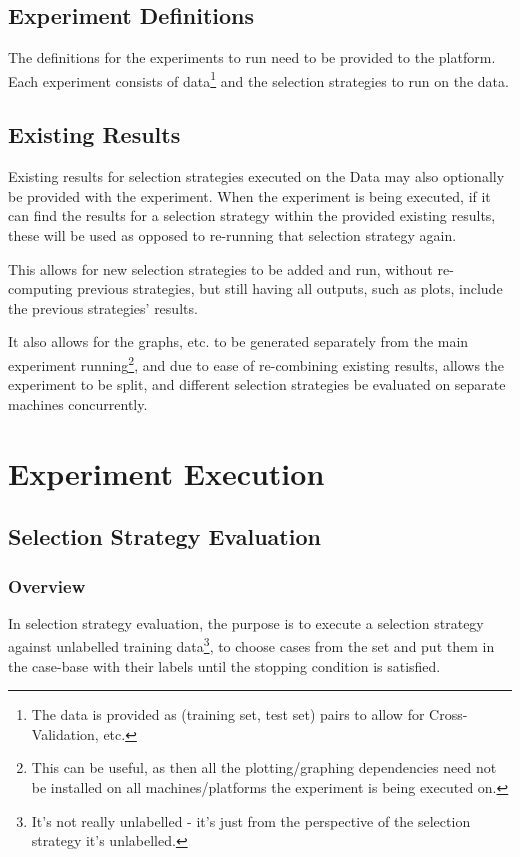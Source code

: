 \documentclass[a4paper,11pt]{report}
\begin{document}
\subsection{Experiment Definitions}
The definitions for the experiments to run need to be provided to the platform. Each experiment consists of data\footnote{ The data is provided as (training set, test set) pairs to allow for Cross-Validation, etc.} and the selection strategies to run on the data.

\subsection{Existing Results}
Existing results for selection strategies executed on the Data may also optionally be provided with the experiment. When the experiment is being executed, if it can find the results for a selection strategy within the provided existing results, these will be used as opposed to re-running that selection strategy again.

This allows for new selection strategies to be added and run, without re-computing previous strategies, but still having all outputs, such as plots, include the previous strategies' results.

It also allows for the graphs, etc. to be generated separately from the main experiment running\footnote{This can be useful, as then all the plotting/graphing dependencies need not be installed on all machines/platforms the experiment is being executed on.}, and due to ease of re-combining existing results, allows the experiment to be split, and different selection strategies be evaluated on separate machines concurrently.

\section{Experiment Execution}
\subsection{Selection Strategy Evaluation}
\subsubsection{Overview}
In selection strategy evaluation, the purpose is to execute a selection strategy against unlabelled training data\footnote{It's not really unlabelled - it's just from the perspective of the selection strategy it's unlabelled.}, to choose cases from the set and put them in the case-base with their labels until the stopping condition is satisfied.
\end{document}
